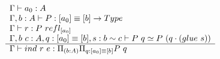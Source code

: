 \begin{code}[hide]
\AgdaOperator{\AgdaInductiveConstructor{]}}\AgdaSymbol{)}\AgdaSpace{}%
\AgdaSpace{}%
\AgdaSpace{}%
\AgdaSpace{}%
\AgdaSpace{}%
\AgdaSpace{}%
\AgdaSymbol{(}\AgdaSpace{}%
\AgdaSpace{}%
\AgdaSpace{}%
\AgdaSymbol{))}\<%
\\
%
\>[6]\AgdaComment{-------------------------------------------------------------------}\<%
\\
%
\>[6]\AgdaSpace{}%
\AgdaSymbol{\{}\AgdaSpace{}%
\AgdaSymbol{:}\AgdaSpace{}%
\AgdaSymbol{\}}\AgdaSpace{}%
\AgdaSpace{}%
\AgdaSymbol{(}\AgdaSpace{}%
\AgdaSymbol{:}\AgdaSpace{}%
\AgdaOperator{\AgdaInductiveConstructor{[}}\AgdaSpace{}%
\AgdaSpace{}%
\AgdaOperator{\AgdaInductiveConstructor{]}}\AgdaSpace{}%
\AgdaSpace{}%
\AgdaOperator{\AgdaInductiveConstructor{[}}\AgdaSpace{}%
\AgdaSpace{}%
\AgdaOperator{\AgdaInductiveConstructor{]}}\AgdaSymbol{)}\AgdaSpace{}%
\AgdaSpace{}%
\AgdaSpace{}%
\<%
\end{code}
\begin{equation}
  \label{eq:coequalizer-induction}
  \begin{centering}
    \begin{array}[t]{l}
      \Gamma \vdash a_0 : A\\
      \Gamma, b : A \vdash P : [a_0] \equiv [b] \ra Type\\
      \Gamma \vdash r : P~refl_{[a_0]}\\
      \Gamma, b~c : A, q : [a_0] \equiv [b], s : b \sim c \vdash P~q \simeq P~(q \cdot (glue~s))\\
      \hline
      \Gamma \vdash ind~r~e : \Pi_{(b : A)} \Pi_{q : [a_0] \equiv [b]} P~q
    \end{array}
  \end{centering}
\end{equation}

